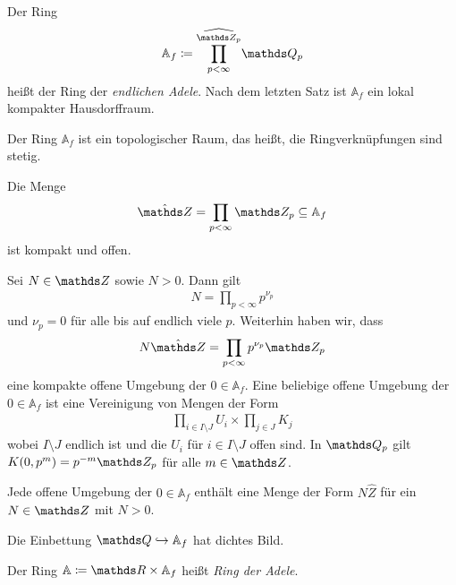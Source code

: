 \begin{defi}
Der Ring
\begin{align*}
\mathbb{A}_f \coloneqq \widehat{\prod_{p<\infty}^{\Z_p}} \Q_p
\end{align*}
heißt der Ring der \emph{endlichen Adele}.
Nach dem letzten Satz ist $\mathbb{A}_f$ ein lokal kompakter Hausdorffraum.
\end{defi}


\begin{prop}
Der Ring $\mathbb{A}_f$ ist ein topologischer Raum, das heißt, die Ringverknüpfungen sind stetig.
\end{prop}

\begin{prop}
Die Menge
\begin{align*}
\hat{\Z}=\prod_{p <\infty} \Z_p \subseteq \mathbb{A}_f
\end{align*}
ist kompakt und offen.
\end{prop}

Sei $N\in \Z$ sowie $N>0$. Dann gilt
\begin{align*}
N=\prod_{p<\infty} p^{\nu_p}
\end{align*}
und $\nu_p=0$ für alle bis auf endlich viele $p$.
Weiterhin haben wir, dass
\begin{align*}
N \hat{\Z}=\prod_{p <\infty} p^{\nu_p}\Z_p
\end{align*}
eine kompakte offene Umgebung der $0 \in \mathbb{A}_f$.
Eine beliebige offene Umgebung der $0 \in \mathbb{A}_f$ ist eine Vereinigung von Mengen der Form
\begin{align*}
\prod_{i \in I\setminus J} U_i \times \prod_{j \in J} K_j
\end{align*}
wobei $I\setminus J$ endlich ist und die $U_i$ für $i \in I \setminus J$ offen sind.
In $\Q_p$ gilt $K(0,p^m)=p^{-m}\Z_p$ für alle $m \in \Z$.

\begin{prop}
Jede offene Umgebung der $0\in \mathbb{A}_f$ enthält eine Menge der Form $N \hat{Z}$ für ein $N \in \Z$ mit $N>0$.
\end{prop}

\begin{prop}
Die Einbettung $\Q \hookrightarrow \mathbb{A}_f$ hat dichtes Bild.
\end{prop}

\begin{defi}
Der Ring $\mathbb{A} \coloneqq \R \times \mathbb{A}_f$ heißt \emph{Ring der Adele}.
\end{defi}

